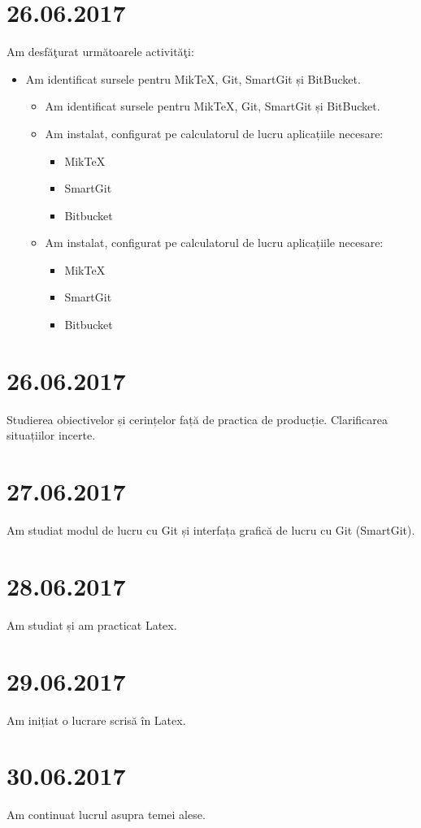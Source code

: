 \documentclass{report}
\begin{document}
\chapter{26.06.2017}
Am desfăţurat următoarele activităţi:
\begin{itemize}
\item
Am identificat sursele pentru MikTeX, Git, SmartGit și BitBucket.
\begin{itemize}
\item
Am identificat sursele pentru MikTeX, Git, SmartGit și BitBucket.
\item
Am instalat, configurat pe calculatorul de lucru aplicațiile necesare:
\begin{itemize}
\item
MikTeX
\item
SmartGit
\item
Bitbucket
\end{itemize}
\item
Am instalat, configurat pe calculatorul de lucru aplicațiile necesare:
\begin{itemize}
\item
MikTeX
\item
SmartGit
\item
Bitbucket
\end{itemize}

\end{itemize}
\end{itemize}

\chapter{26.06.2017}
Studierea obiectivelor și cerințelor față de practica de producție. Clarificarea situațiilor incerte.
\chapter{27.06.2017}
Am studiat modul de lucru cu Git și interfața grafică de lucru cu Git (SmartGit).
\chapter{28.06.2017}
Am studiat și am practicat Latex.
\chapter{29.06.2017}
Am inițiat o lucrare scrisă în Latex.
\chapter{30.06.2017}
Am continuat lucrul asupra temei alese.
\end{document}
